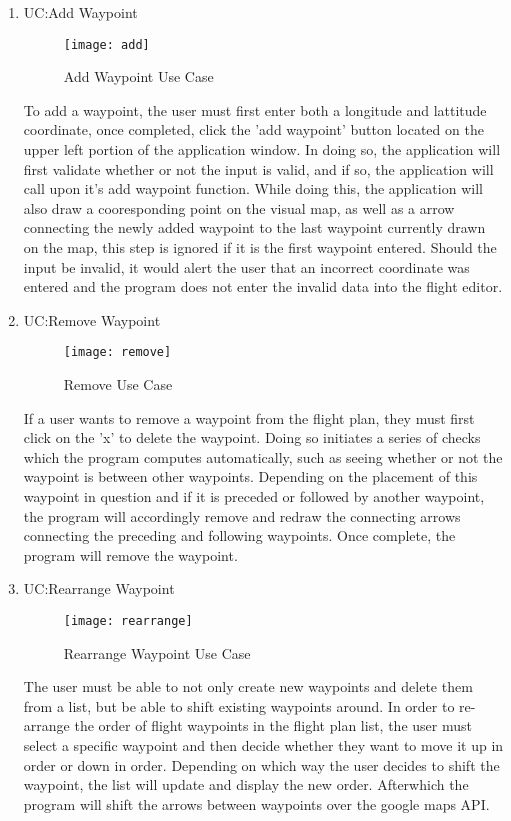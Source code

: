 \documentclass[12pt, letterpaper]{article}
\begin{document}
\begin{enumerate}
      \item UC:Add Waypoint
	\begin{figure}[!ht]
		\caption{Add Waypoint Use Case}
    		\centering
    		\texttt{[image: add]}
	\end{figure}
	To add a waypoint, the user must first enter both a longitude and lattitude coordinate, once completed, click the 'add waypoint' button located on the upper left portion of the application window. 		In doing so, the application will first validate whether or not the input is valid, and if so, the application will call upon it's add waypoint function. While doing this, the application will 		also draw a cooresponding point on the visual map, as well as a arrow connecting the newly added waypoint to the last waypoint currently drawn on the map, this step is ignored if it is the first 		waypoint entered. Should the input be invalid, it would alert the user that an incorrect coordinate was entered and the program does not enter the invalid data into the flight editor.

      \item UC:Remove Waypoint
	\begin{figure}[!ht]
		\caption{Remove Use Case}
    		\centering
    		\texttt{[image: remove]}
	\end{figure}
	If a user wants to remove a waypoint from the flight plan, they must first click on the 'x' to delete the waypoint. Doing so initiates a series of checks which the program computes automatically, such as seeing whether or not the waypoint is between other waypoints. Depending on the placement of this waypoint in question and if it is preceded or followed by another waypoint, the program will accordingly remove and redraw the connecting arrows connecting the preceding and following waypoints. Once complete, the program will remove the waypoint.

      \item UC:Rearrange Waypoint
	\begin{figure}[!ht]
    		\centering
		\caption{Rearrange Waypoint Use Case}
    		\texttt{[image: rearrange]}
	\end{figure}
	The user must be able to not only create new waypoints and delete them from a list, but be able to shift existing waypoints around. In order to re-arrange the order of flight waypoints in the flight plan list, the user must select a specific waypoint and then decide whether they want to move it up in order or down in order. Depending on which way the user decides to shift the waypoint, the list will update and display the new order. Afterwhich the program will shift the arrows between waypoints over the google maps API. 


\end{enumerate}
\end{document}
